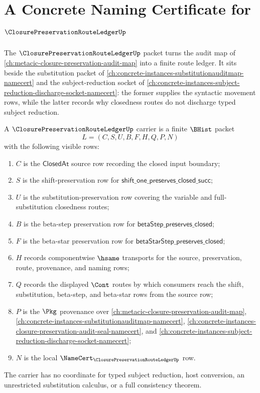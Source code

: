 \chapter{A Concrete Naming Certificate for $\ClosurePreservationRouteLedgerUp$}
\label{ch:concrete-instances-closurepreservationrouteledger-namecert}

The $\ClosurePreservationRouteLedgerUp$ packet turns the audit map of \autoref{ch:metacic-closure-preservation-audit-map} into a finite route ledger. It sits beside the substitution packet of \autoref{ch:concrete-instances-substitutionauditmap-namecert} and the subject-reduction socket of \autoref{ch:concrete-instances-subject-reduction-discharge-socket-namecert}: the former supplies the syntactic movement rows, while the latter records why closedness routes do not discharge typed subject reduction.

\begin{definition}
\label{def:closure-preservation-route-ledger-carrier}
A $\ClosurePreservationRouteLedgerUp$ carrier is a finite $\BHist$ packet
$$
L=(C,S,U,B,F,H,Q,P,N)
$$
with the following visible rows:
\begin{enumerate}
\item $C$ is the $\mathsf{ClosedAt}$ source row recording the closed input boundary;
\item $S$ is the shift-preservation row for $\mathsf{shift\_one\_preserves\_closed\_succ}$;
\item $U$ is the substitution-preservation row covering the variable and full-substitution closedness routes;
\item $B$ is the beta-step preservation row for $\mathsf{betaStep\_preserves\_closed}$;
\item $F$ is the beta-star preservation row for $\mathsf{betaStarStep\_preserves\_closed}$;
\item $H$ records componentwise $\hsame$ transports for the source, preservation, route, provenance, and naming rows;
\item $Q$ records the displayed $\Cont$ routes by which consumers reach the shift, substitution, beta-step, and beta-star rows from the source row;
\item $P$ is the $\Pkg$ provenance over \autoref{ch:metacic-closure-preservation-audit-map}, \autoref{ch:concrete-instances-substitutionauditmap-namecert}, \autoref{ch:concrete-instances-closure-preservation-audit-seal-namecert}, and \autoref{ch:concrete-instances-subject-reduction-discharge-socket-namecert};
\item $N$ is the local $\NameCert_{\ClosurePreservationRouteLedgerUp}$ row.
\end{enumerate}
The carrier has no coordinate for typed subject reduction, host conversion, an unrestricted substitution calculus, or a full consistency theorem.
\end{definition}


